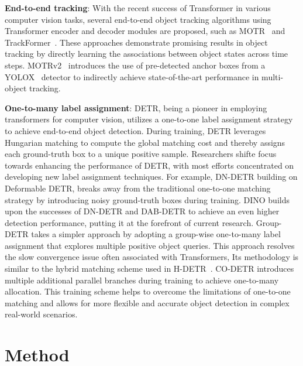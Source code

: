 \documentclass{article}
\begin{document}
\textbf{End-to-end tracking}: With the recent success of Transformer in various computer vision tasks, several end-to-end object tracking algorithms using Transformer encoder and decoder modules are proposed, such as MOTR~\cite{zeng2022motr} and TrackFormer~\cite{meinhardt2022trackformer}. These approaches demonstrate promising results in object tracking by directly learning the associations between object states across time steps. MOTRv2~\cite{zhang2022motrv2} introduces the use of pre-detected anchor boxes from a YOLOX~\cite{ge2021yolox} detector to indirectly achieve state-of-the-art performance in multi-object tracking.

\textbf{One-to-many label assignment}: DETR\cite{carion2020end}, being a pioneer in employing transformers for computer vision, utilizes a one-to-one label assignment strategy to achieve end-to-end object detection. During training, DETR\cite{carion2020end} leverages Hungarian matching to compute the global matching cost and thereby assigns each ground-truth box to a unique positive sample. Researchers shifte focus towards enhancing the performance of DETR\cite{carion2020end}, with most efforts concentrated on developing new label assignment techniques. For example, DN-DETR\cite{li2022dn} building on Deformable DETR\cite{zhu2020deformable}, breaks away from the traditional one-to-one matching strategy by introducing noisy ground-truth boxes during training.  DINO\cite{zhang2022dino} builds upon the successes of DN-DETR\cite{li2022dn} and DAB-DETR\cite{liu2022dab} to achieve an even higher detection performance, putting it at the forefront of current research. Group-DETR\cite{chen2022group} takes a simpler approach by adopting a group-wise one-to-many label assignment that explores multiple positive object queries. This approach resolves the slow convergence issue often associated with Transformers, Its methodology is similar to the hybrid matching scheme used in H-DETR~\cite{jia2022detrs}. CO-DETR\cite{zong2211detrs} introduces multiple additional parallel branches during training to achieve one-to-many allocation. This training scheme helps to overcome the limitations of one-to-one matching and allows for more flexible and accurate object detection in complex real-world scenarios.





\section{Method}
\end{document}
